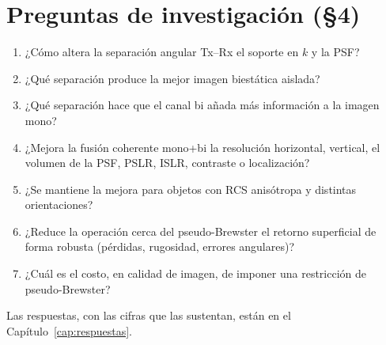 \documentclass[11pt,a4paper]{report}
\begin{document}
\section{Preguntas de investigación (§4)}
\begin{enumerate}[itemsep=1pt]
  \item ¿Cómo altera la separación angular Tx--Rx el soporte en $k$ y la PSF?
  \item ¿Qué separación produce la mejor imagen biestática aislada?
  \item ¿Qué separación hace que el canal bi añada más información a la imagen mono?
  \item ¿Mejora la fusión coherente mono+bi la resolución horizontal, vertical, el volumen de la PSF, PSLR, ISLR, contraste o localización?
  \item ¿Se mantiene la mejora para objetos con RCS anisótropa y distintas orientaciones?
  \item ¿Reduce la operación cerca del pseudo-Brewster el retorno superficial de forma robusta (pérdidas, rugosidad, errores angulares)?
  \item ¿Cuál es el costo, en calidad de imagen, de imponer una restricción de pseudo-Brewster?
\end{enumerate}
Las respuestas, con las cifras que las sustentan, están en el
Capítulo~\ref{cap:respuestas}.









\appendix


\end{document}

